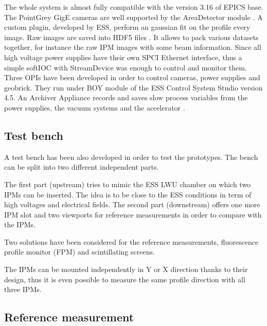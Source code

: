 \begin{refsection}
  The whole system is almost fully compatible with the version 3.16 of EPICS base. The PointGrey GigE cameras are well supported by the AreaDetector module \cite{ad2019}. A custom plugin, developed by ESS, perform an gaussian fit on the profile every image. Raw images are saved into HDF5 files \cite{hdf5}. It allows to pack  various datasets together, for instance the raw IPM images with some beam information.
  Since all high voltage power supplies have their own SPCI Ethernet interface, thus a simple softIOC with StreamDevice\cite{streamdevice2019} was enough to control and monitor them.
  Three OPIs have been developed in order to control cameras, power supplies and geobrick. They run under BOY module of the ESS Control System Studio version 4.5. An Archiver Appliance records and saves slow process variables from the power supplies, the vacuum systems and the accelerator \cite{archiver2019}.

  

  \subsection{Test bench}
  A test bench has been also developed in order to test the prototypes. The bench can be split into two different independent parts.

  The first part (upstream) tries to mimic the ESS LWU chamber on which two IPMs can be inserted. The idea is to be close to the ESS conditions in term of high voltages and electrical fields.
  The second part (downstream) offers one more IPM slot and two viewports for reference measurements in order to compare with the IPMs.

  Two solutions have been considered for the reference measurements, fluorescence profile monitor (FPM) and scintillating screens.

  The IPMs can be mounted independently in Y or X direction thanks to their design, thus it is even possible to measure the same profile direction with all three IPMs.

  


  \subsection{Reference measurement}

  
  


\end{refsection}
